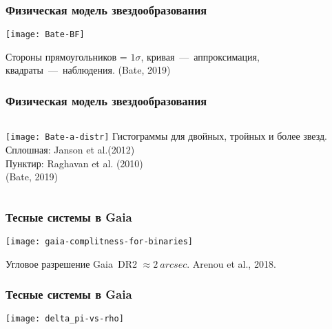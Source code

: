 \begin{frame}%
\frametitle{Физическая модель звездообразования}
\begin{center}
\texttt{[image: Bate-BF]}
\end{center}
{\scriptsize Стороны прямоугольников = $1\sigma$, кривая~---~аппроксимация, квадраты~---~наблюдения. (Bate, 2019)}
\end{frame}

\begin{frame}%
\frametitle{Физическая модель звездообразования}
\begin{columns}
	\texttt{[image: Bate-a-distr]}
{\scriptsize Гистограммы для двойных, тройных и более звезд.} \\
{\scriptsize Сплошная: Janson et al.(2012)} \\
{\scriptsize Пунктир: Raghavan et al. (2010)} \\
{\scriptsize (Bate, 2019)}%
\end{columns}
\end{frame}


\begin{frame}
\frametitle{Тесные системы в Gaia}
\begin{center}
\texttt{[image: gaia-complitness-for-binaries]}
\end{center}
{\footnotesize Угловое разрешение Gaia~DR2 $\approx 2~arcsec$. Arenou et al., 2018.}
\end{frame}

\begin{frame}
\frametitle{Тесные системы в Gaia}
\begin{center}
\texttt{[image: delta\_pi-vs-rho]}
\end{center}
\end{frame}

